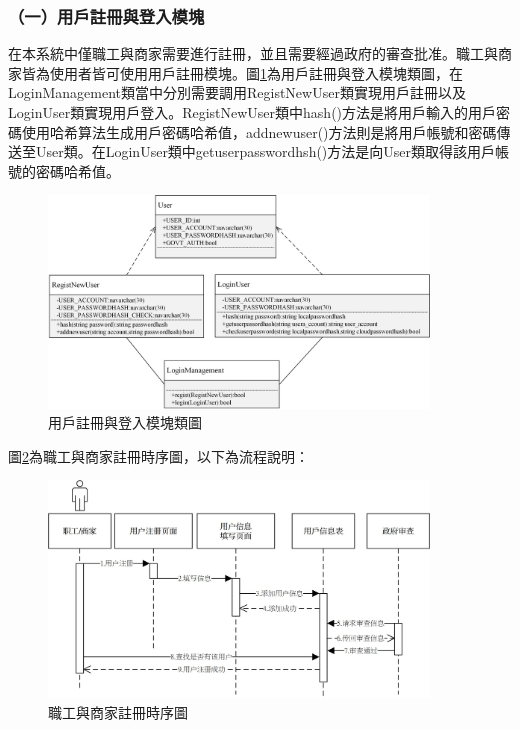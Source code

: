 \subsubsection{（一）用戶註冊與登入模塊}
在本系統中僅職工與商家需要進行註冊，並且需要經過政府的審查批准。職工與商家皆為使用者皆可使用用戶註冊模塊。圖\ref{c3}為用戶註冊與登入模塊類圖，在LoginManagement類當中分別需要調用RegistNewUser類實現用戶註冊以及LoginUser類實現用戶登入。RegistNewUser類中hash()方法是將用戶輸入的用戶密碼使用哈希算法生成用戶密碼哈希值，addnewuser()方法則是將用戶帳號和密碼傳送至User類。在LoginUser類中getuserpasswordhsh()方法是向User類取得該用戶帳號的密碼哈希值。

	\begin{figure}[!htbp]
		\centering
		\includegraphics[width = 0.9\textwidth]{c3.jpg}
		\caption{用戶註冊與登入模塊類圖}\label{c3}
	\end{figure}

	圖\ref{time1}為職工與商家註冊時序圖，以下為流程說明：

	\begin{figure}[!htbp]
		\centering
		\includegraphics[width = 0.9\textwidth]{time1.jpg}
		\caption{職工與商家註冊時序圖}\label{time1}
	\end{figure}

